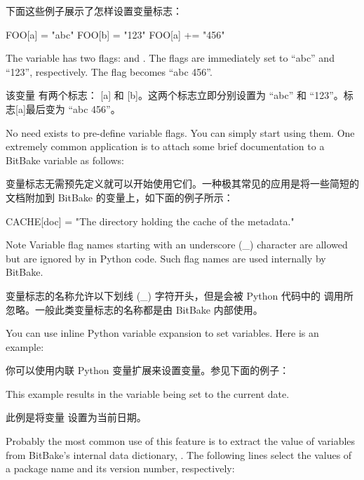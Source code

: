 下面这些例子展示了怎样设置变量标志：

\begin{pyglist}
FOO[a] = "abc"
FOO[b] = "123"
FOO[a] += "456"
\end{pyglist}

The variable  has two flags: \code{[a]} and \code{[b]}. The flags are immediately set to ``abc'' and ``123'', respectively. The \code{[a]} flag becomes ``abc 456''.

该变量  有两个标志： [a] 和 [b]。这两个标志立即分别设置为 ``abc'' 和 ``123''。标志[a]最后变为 ``abc 456''。

No need exists to pre-define variable flags. You can simply start using them. One extremely common application is to attach some brief documentation to a BitBake variable as follows:

变量标志无需预先定义就可以开始使用它们。一种极其常见的应用是将一些简短的文档附加到 BitBake 的变量上，如下面的例子所示：

\begin{pyglist}
CACHE[doc] = "The directory holding the cache of the metadata."
\end{pyglist}

\begin{noteblock}{Note}%
Variable flag names starting with an underscore (\_) character are allowed but are ignored by  in Python code. Such flag names are used internally by BitBake.

\medskip
变量标志的名称允许以下划线 (\_) 字符开头，但是会被 Python 代码中的  调用所忽略。一般此类变量标志的名称都是由 BitBake 内部使用。
\end{noteblock}

\label{section:Inline Python Variable Expansion}

You can use inline Python variable expansion to set variables. Here is an example:

你可以使用内联 Python 变量扩展来设置变量。参见下面的例子：


This example results in the  variable being set to the current date.

此例是将变量  设置为当前日期。

Probably the most common use of this feature is to extract the value of variables from BitBake's internal data dictionary, . The following lines select the values of a package name and its version number, respectively:

